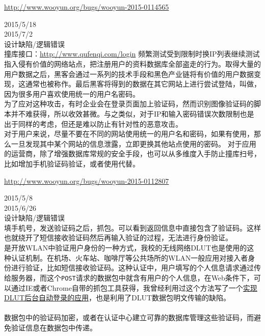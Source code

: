 \documentclass{leptc}
\begin{document}
\begin{center}
	\url{http://www.wooyun.org/bugs/wooyun-2015-0114565}
\end{center}
 2015/5/18 \\
 2015/7/2 \\
 设计缺陷/逻辑错误 \\
 撞库接口：\url{http://www.qufenqi.com/login} 频繁测试受到限制时换IP列表继续测试\\
 指入侵有价值的网络站点，把注册用户的资料数据库全部盗走的行为。取得大量的用户数据之后，黑客会通过一系列的技术手段和黑色产业链将有价值的用户数据变现，这通常也被称作。最后黑客将得到的数据在其它网站上进行尝试登陆，叫做，因为很多用户喜欢使用统一的用户名密码。\\
为了应对这种攻击，有时企业会在登录页面加上验证码，然而识别图像验证码的脚本并不难获得，所以收效甚微。与之类似，对于IP和输入密码错误次数限制也是出于同样的考虑，但还是难以防止有针对性的恶意攻击。\\
  对于用户来说，尽量不要在不同的网站使用统一的用户名和密码，如果有使用，那么一旦发现其中某个网站的信息泄露，立即更换其他站点使用的密码。 对于应用的运营商，除了增强数据库常规的安全手段，也可以从多维度入手防止撞库扫号，比如增加手机验证码验证，或者使用代替。\\
\begin{center}

\end{center}

\begin{center}
	\url{http://www.wooyun.org/bugs/wooyun-2015-0112807}
\end{center}
 2015/5/8 \\
 2015/6/26 \\
 设计缺陷/逻辑错误 \\
 填手机号，发送验证码之后，抓包。可以看到返回信息中直接包含了验证码。这样也就绕开了短信接收验证码然后再输入验证的过程，无法进行身份验证。\\
 是开放WLAN中验证用户身份的一种方式，我校的无线网络DLUT也是使用的这种认证机制。在机场、火车站、咖啡厅等公共场所的WLAN一般应用对接入者身份进行验证，比如短信接收验证码。这种认证中，用户填写的个人信息请求通过传给服务器，而这个\verb|POST|请求的数据包中就含有用户的个人信息，在Web条件下，可以通过IE或者Chrome自带的抓包工具获得，我曾经利用过这个方法写了一个\href{https://github.com/Lixinyi-DUT/WirelessHelper}{实现DLUT后台自动登录的应用}，也是利用了DLUT数据包明文传输的缺陷。\\
\\
 数据包中的验证码加密，或者在认证中心建立可靠的数据库管理这些验证码，而避免验证信息在数据包中传递。\\
\end{document}
